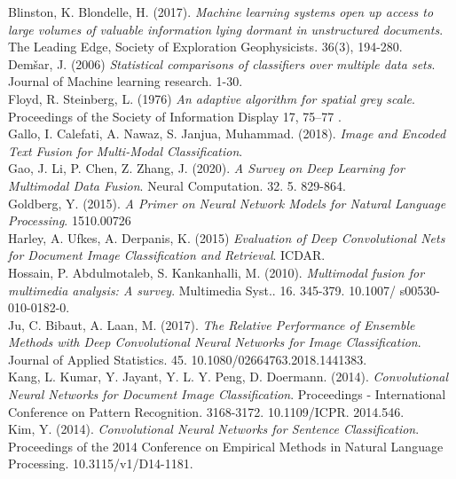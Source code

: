 \documentclass[a4paper,12pt]{article}
\begin{document}
\noindent Blinston, K. Blondelle, H. (2017). \emph{Machine learning systems open up access to large volumes of valuable information lying dormant in unstructured documents}. The Leading Edge, Society of Exploration Geophysicists. 36(3), 194-280.\\

\noindent Demšar, J. (2006) \emph{Statistical comparisons of classifiers over multiple data sets}. Journal of Machine learning research. 1-30.\\

\noindent Floyd, R. Steinberg, L. (1976) \emph{An adaptive algorithm for spatial grey scale}. Proceedings of the Society of Information Display 17, 75–77 .\\

\noindent Gallo, I. Calefati, A. Nawaz, S. Janjua, Muhammad. (2018). \emph{Image and Encoded Text Fusion for Multi-Modal Classification}. \\

\noindent Gao, J. Li, P. Chen, Z. Zhang, J. (2020).  \emph{A Survey on Deep Learning for Multimodal Data Fusion}. Neural Computation. 32. 5. 829-864.\\

\noindent Goldberg, Y. (2015). \emph{A Primer on Neural Network Models for Natural Language Processing}. 1510.00726\\

\noindent Harley, A. Ufkes, A. Derpanis, K. (2015) \emph{Evaluation of Deep Convolutional Nets for Document Image Classification and Retrieval}. ICDAR.\\

\noindent Hossain, P. Abdulmotaleb, S. Kankanhalli, M. (2010). \emph{Multimodal fusion for multimedia analysis: A survey}. Multimedia Syst.. 16. 345-379. 10.1007/
s00530-010-0182-0. \\

\noindent Ju, C. Bibaut, A. Laan, M. (2017). \emph{The Relative Performance of Ensemble Methods with Deep Convolutional Neural Networks for Image Classification}. Journal of Applied Statistics. 45. 10.1080/02664763.2018.1441383.\\

\noindent Kang, L. Kumar, Y. Jayant, Y. L. Y. Peng, D. Doermann. (2014). \emph{Convolutional Neural Networks for Document Image Classification}. Proceedings - International Conference on Pattern Recognition. 3168-3172. 10.1109/ICPR.
2014.546. \\

\noindent Kim, Y. (2014).  \emph{Convolutional Neural Networks for Sentence Classification}. Proceedings of the 2014 Conference on Empirical Methods in Natural Language Processing. 10.3115/v1/D14-1181.\\
\end{document}
